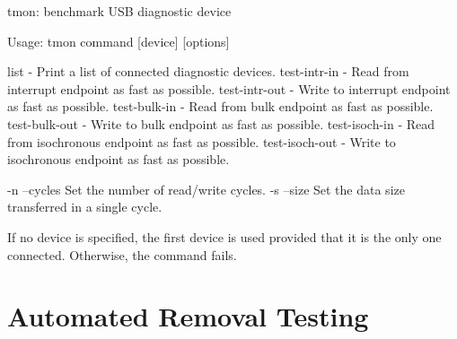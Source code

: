 \begin{bdsh}
tmon: benchmark USB diagnostic device

Usage: tmon command [device] [options]

      list - Print a list of connected diagnostic devices.
      test-intr-in - Read from interrupt endpoint as fast as possible.
      test-intr-out - Write to interrupt endpoint as fast as possible.
      test-bulk-in - Read from bulk endpoint as fast as possible.
      test-bulk-out - Write to bulk endpoint as fast as possible.
      test-isoch-in - Read from isochronous endpoint as fast as possible.
      test-isoch-out - Write to isochronous endpoint as fast as possible.

      -n --cycles
            Set the number of read/write cycles.
      -s --size
            Set the data size transferred in a single cycle.

If no device is specified, the first device is used provided that it is the
only one connected. Otherwise, the command fails.

\end{bdsh}


\section{Automated Removal Testing}


